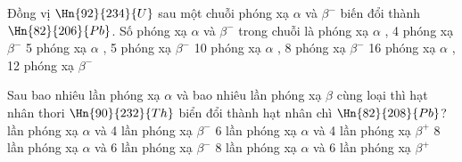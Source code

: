 \begin{vidu}%
Đồng vị $\Hn{92}{234}{U}$ sau một chuỗi phóng xạ $\alpha$ và $\beta^-$ biến đổi thành $\Hn{82}{206}{Pb}$. Số phóng xạ $\alpha$ và $\beta^-$ trong chuỗi là
\choice
{ phóng xạ $\alpha$ , 4 phóng xạ $\beta^-$}
{5 phóng xạ $\alpha$ , 5 phóng xạ $\beta^-$}
{10 phóng xạ $\alpha$ , 8 phóng xạ $\beta^-$}
{16 phóng xạ $\alpha$ , 12 phóng xạ $\beta^-$}
\end{vidu}
\begin{vidu}%
Sau bao nhiêu lần phóng xạ $\alpha$ và bao nhiêu lần phóng xạ $\beta$ cùng loại thì hạt nhân thori $\Hn{90}{232}{Th}$ biển đổi thành hạt nhân chì $\Hn{82}{208}{Pb}$?
\choice
{ lần phóng xạ $\alpha$ và 4 lần phóng xạ $\beta^-$}
{6 lần phóng xạ $\alpha$ và 4 lần phóng xạ $\beta^+$}
{8 lần phóng xạ $\alpha$ và 6 lần phóng xạ $\beta^-$}
{8 lần phóng xạ $\alpha$ và 6 lần phóng xạ $\beta^+$}
\end{vidu}